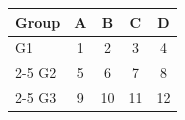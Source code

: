 \begin{table}[htbp]
\centering
\begin{tabular}{lcccc}
\toprule
Group & A & B & C & D \\
\midrule
G1 & 1 & 2 & 3 & 4 \\
\cmidrule(lr){2-5}
G2 & 5 & 6 & 7 & 8 \\
\cmidrule(lr){2-5}
G3 & 9 & 10 & 11 & 12 \\
\bottomrule
\end{tabular}
\end{table}
